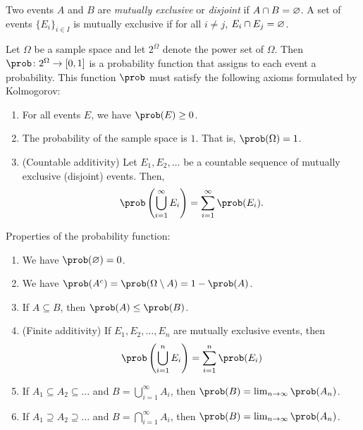 
\begin{definition}
  Two events $A$ and $B$ are \emph{mutually exclusive} or \emph{disjoint} if $A \cap B = \varnothing$. A set of events $\{E_i\}_{i \in I}$ is mutually exclusive if for all $i \neq j$, $E_i \cap E_j = \varnothing$.
\end{definition}

\begin{definition}
  Let $\Omega$ be a sample space and let $2^{\Omega}$ denote the power set of $\Omega$. Then  $\prob \colon 2^{\Omega} \to [0, 1]$ is a probability function that assigns to each event a probability. This function $\prob$ must satisfy the following axioms formulated by Kolmogorov:
  \begin{enumerate}
    \item For all events $E$, we have $\prob(E) \ge 0$.
    \item The probability of the sample space is $1$. That is, $\prob(\Omega) = 1$.
    \item (Countable additivity) Let $E_1, E_2, \dots$ be a countable sequence of mutually exclusive (disjoint) events. Then, \[
    \prob\left( \bigcup_{i = 1}^{\infty} E_i \right) = \sum_{i = 1}^{\infty} \prob(E_i).
    \] 
  \end{enumerate}
\end{definition}

\begin{proposition}
  Properties of the probability function:
  \begin{enumerate}
    \item We have $\prob(\O) = 0$.
    \item We have $\prob(A^{c}) = \prob(\Omega \setminus A) = 1 - \prob(A)$.
    \item If $A \subseteq B$, then $\prob(A) \le \prob(B)$.
    \item (Finite additivity) If $E_1, E_2, \dots, E_n$ are mutually exclusive events, then \[
      \prob \left( \bigcup_{i = 1}^{n} E_i \right) = \sum_{i = 1}^{n} \prob(E_i)\]
    \item If $A_1 \subseteq A_2 \subseteq \dots$ and $B = \bigcup_{i = 1}^{\infty} A_i$, then $\prob(B) = \lim_{n \to \infty} \prob(A_n)$.
    \item If $A_1 \supseteq A_2 \supseteq \dots$ and $B = \bigcap_{i = 1}^{\infty} A_i$, then $\prob(B) = \lim_{n \to \infty} \prob(A_n)$.
  \end{enumerate}

\end{proposition}

